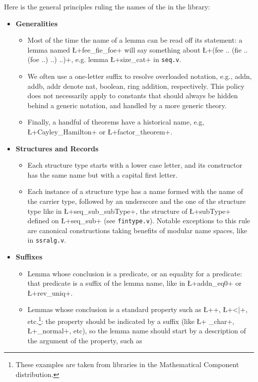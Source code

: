 Here is the general principles ruling the names of the in the \mcbMC{} library:
\begin{itemize}
\item{\bf Generalities}
  \begin{itemize}
  \item Most of the time the name of a lemma can be read off its
    statement: a lemma named \L+fee_fie_foe+ will say something about
    \L+(fee .. (fie ..(foe ..) ..) ..)+, e.g. lemma \L+size_cat+ in
    {\tt seq.v}.
  \item We often use a one-letter suffix to resolve overloaded
    notation, e.g., addn, addb, addr denote nat, boolean, ring
    addition, respectively. This policy does not necessarily apply to
    constants that should always be hidden behind a generic notation,
    and handled by a more generic theory.
  \item Finally, a handful of theorems have a historical name,
    e.g, \L+Cayley_Hamilton+ or \L+factor_theorem+.
  \end{itemize}
\item{\bf Structures and Records}
  \begin{itemize}
  \item Each structure type starts with a
    lower case letter, and its constructor has the same name but with a
    capital first letter.
  \item Each instance of a structure type has a name formed with the
    name of the carrier type, followed by an underscore and the one of
    the structure type like in \L+seq_sub_subType+, the structure of
    \L+subType+ defined on \L+seq_sub+ (see {\tt fintype.v}). Notable
    exceptions to this rule are canonical constructions taking
    benefits of modular name spaces, like in {\tt ssralg.v}.
  \end{itemize}
\item {\bf Suffixes}
  \begin{itemize}
  \item Lemma whose conclusion is a predicate, or an equality
    for a predicate: that predicate is a suffix of the lemma name,
    like in \L+addn_eq0+ or \L+rev_uniq+.
  \item Lemmas whose conclusion is a standard property such as
    \L+\char+, \L+<|+, etc.\footnote{These examples are taken from
      libraries in the Mathematical Component distribution.}:
    the property should be
    indicated by a suffix (like \L+ _char+, \L+_normal+, etc), so
    the lemma name
    should start by a description of the argument of the property, such as

\end{itemize}
\end{itemize}
